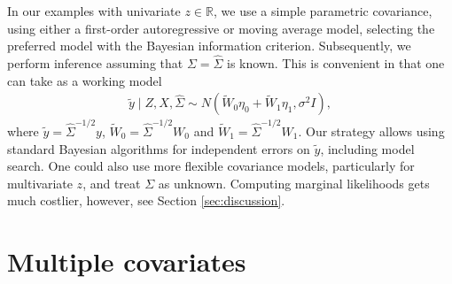 In our examples with univariate $z \in \mathbb{R}$, we use a simple parametric covariance, 
using either a first-order autoregressive or moving average model, selecting the preferred model with the Bayesian information criterion. 
Subsequently, we perform inference assuming that $\Sigma = \hat{\Sigma}$ is known. %
This is convenient in that one can take as a working model
\begin{align}
\tilde{y} \mid Z, X, \hat{\Sigma} \sim N \left( \widetilde{W}_0 \eta_0 + \widetilde{W}_1 \eta_1, \sigma^2 I \right),
\nonumber
\end{align}
where $\tilde{y}= \hat{\Sigma}^{-1/2} y$, $\widetilde{W}_0= \hat{\Sigma}^{-1/2} W_0$ and $\widetilde{W}_1= \hat{\Sigma}^{-1/2} W_1$.
Our strategy allows using standard Bayesian algorithms for independent errors on $\tilde{y}$, including model search.
 One could also use more flexible covariance models, particularly for multivariate $z$, and treat $\Sigma$ as unknown. Computing marginal likelihoods gets much costlier, however, see Section \ref{sec:discussion}.



\section{Multiple covariates}
\label{sec:multiple_covar}

